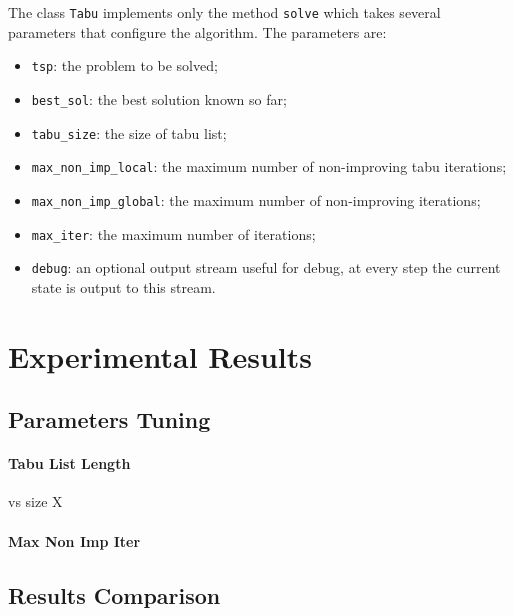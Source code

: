 \documentclass{article}
\begin{document}
The class \texttt{Tabu} implements only the method \texttt{solve} which takes several parameters that configure the algorithm.
The parameters are:
\begin{itemize}
    \item \texttt{tsp}: the problem to be solved;
    \item \texttt{best\_sol}: the best solution known so far;
    \item \texttt{tabu\_size}: the size of tabu list;
    \item \texttt{max\_non\_imp\_local}: the maximum number of non-improving tabu iterations;
    \item \texttt{max\_non\_imp\_global}: the maximum number of non-improving iterations;
    \item \texttt{max\_iter}: the maximum number of iterations;
    \item \texttt{debug}: an optional output stream useful for debug, at every step the current state is output to this stream.
\end{itemize}

\section{Experimental Results}

\subsection{Parameters Tuning}
\paragraph{Tabu List Length} vs size X
\paragraph{Max Non Imp Iter}

\subsection{Results Comparison}

\nocite{*}
\printbibliography
\end{document}
